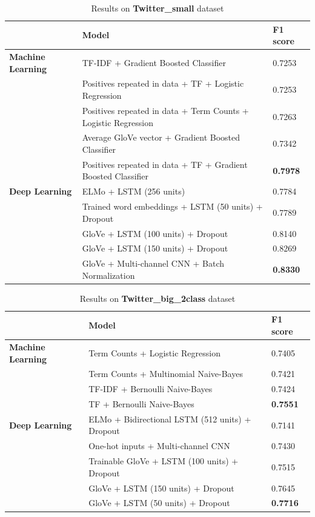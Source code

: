 \documentclass[12pt,a4paper]{article}
\begin{document}
\begin{table}[H]
	\centering
	\vspace*{-18pt}
	\caption{Results on \textbf{Twitter\_small} dataset}
	\label{results2}
	\hspace*{-0.8cm}
	\begin{tabular}{p{3.4cm} p{11cm} p{2cm}} \hline\hline
		& \textbf{Model} & \textbf{F1 score}  \\ \hline
		\textbf{Machine Learning} & TF-IDF + Gradient Boosted Classifier & 0.7253 \\
		& Positives repeated in data + TF + Logistic Regression & 0.7253 \\
		& Positives repeated in data + Term Counts + Logistic Regression & 0.7263 \\
		& Average GloVe vector + Gradient Boosted Classifier & 0.7342 \\
		& Positives repeated in data + TF + Gradient Boosted Classifier & \textbf{0.7978} \\ \hline
		
		\textbf{Deep Learning} & ELMo + LSTM (256 units) & 0.7784 \\
		& Trained word embeddings + LSTM (50 units) + Dropout & 0.7789 \\
		& GloVe + LSTM (100 units) + Dropout & 0.8140 \\ 
		& GloVe + LSTM (150 units) + Dropout & 0.8269 \\
		& GloVe + Multi-channel CNN + Batch Normalization & \textbf{0.8330} \\ \hline
	\end{tabular}
\end{table}

\begin{table}[H]
	\centering
	\vspace*{-18pt}
	\caption{Results on \textbf{Twitter\_big\_2class} dataset}
	\label{results3}
	\hspace*{-0.8cm}
	\begin{tabular}{p{3.4cm} p{11cm} p{2cm}} \hline\hline
		& \textbf{Model} & \textbf{F1 score}  \\ \hline
		
		\textbf{Machine Learning} & Term Counts + Logistic Regression & 0.7405  \\
		& Term Counts + Multinomial Naive-Bayes & 0.7421  \\
		& TF-IDF + Bernoulli Naive-Bayes & 0.7424  \\
		& TF + Bernoulli Naive-Bayes & \textbf{0.7551} \\ \hline
		
		\textbf{Deep Learning} & ELMo + Bidirectional LSTM (512 units) + Dropout & 0.7141 \\
		&  One-hot inputs + Multi-channel CNN & 0.7430 \\
		&  Trainable GloVe + LSTM (100 units) + Dropout & 0.7515  \\  
		&  GloVe + LSTM (150 units) + Dropout & 0.7645  \\
		&  GloVe + LSTM (50 units) + Dropout & \textbf{0.7716} \\ \hline
	\end{tabular}
\end{table}
\end{document}

